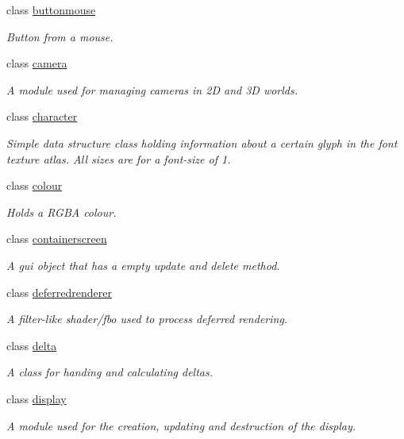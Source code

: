\begin{DoxyCompactItemize}
class \hyperlink{classflounder_1_1buttonmouse}{buttonmouse}
\begin{DoxyCompactList}\small\item\em Button from a mouse. \end{DoxyCompactList}\item 
class \hyperlink{classflounder_1_1camera}{camera}
\begin{DoxyCompactList}\small\item\em A module used for managing cameras in 2D and 3D worlds. \end{DoxyCompactList}\item 
class \hyperlink{classflounder_1_1character}{character}
\begin{DoxyCompactList}\small\item\em Simple data structure class holding information about a certain glyph in the font texture atlas. All sizes are for a font-\/size of 1. \end{DoxyCompactList}\item 
class \hyperlink{classflounder_1_1colour}{colour}
\begin{DoxyCompactList}\small\item\em Holds a R\+G\+BA colour. \end{DoxyCompactList}\item 
class \hyperlink{classflounder_1_1containerscreen}{containerscreen}
\begin{DoxyCompactList}\small\item\em A gui object that has a empty update and delete method. \end{DoxyCompactList}\item 
class \hyperlink{classflounder_1_1deferredrenderer}{deferredrenderer}
\begin{DoxyCompactList}\small\item\em A filter-\/like shader/fbo used to process deferred rendering. \end{DoxyCompactList}\item 
class \hyperlink{classflounder_1_1delta}{delta}
\begin{DoxyCompactList}\small\item\em A class for handing and calculating deltas. \end{DoxyCompactList}\item 
class \hyperlink{classflounder_1_1display}{display}
\begin{DoxyCompactList}\small\item\em A module used for the creation, updating and destruction of the display. \end{DoxyCompactList}\item 

\end{DoxyCompactItemize}

